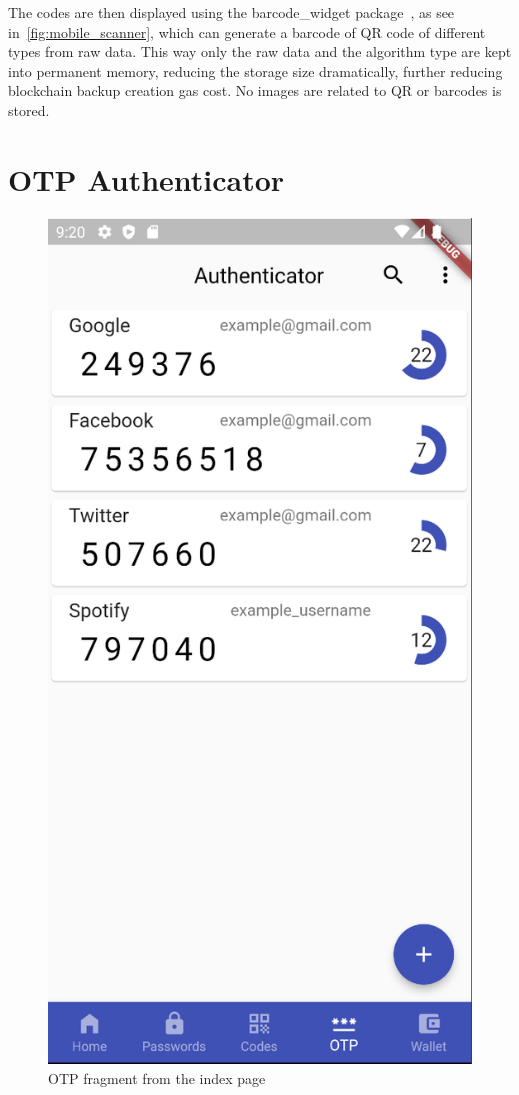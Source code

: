 \documentclass[a4paper,12pt]{report}
\begin{document}
The codes are then displayed using the barcode\_widget
package~\cite{barcodeWidgetDocs}, as see in~\autoref{fig:mobile_scanner}, which
can generate a barcode of QR code of different types from raw data. This way
only the raw data and the algorithm type are kept into permanent memory,
reducing the storage size dramatically, further reducing blockchain backup
creation gas cost. No images are related to QR or barcodes is stored.

\section{OTP Authenticator}

\begin{figure}[H]
    \centering
    \includegraphics[scale=0.43]{images/app/tokens.png}
    \caption{OTP fragment from the index page}\label{fig:otp}
\end{figure}
\end{document}
